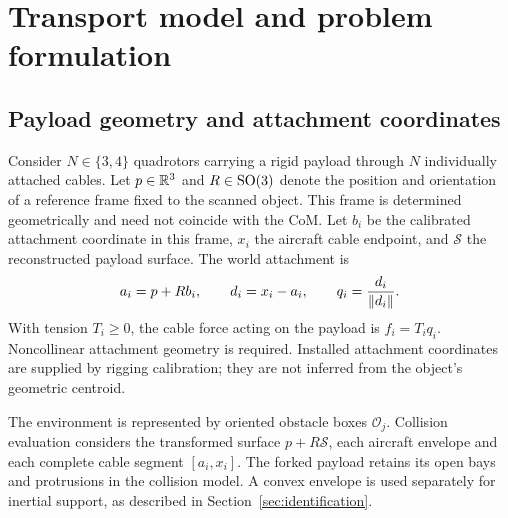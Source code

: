 \section{Transport model and problem formulation}
\subsection{Payload geometry and attachment coordinates}
Consider $N\in\{3,4\}$ quadrotors carrying a rigid payload through $N$ individually attached cables. Let $p\in\mathbb{R}^3$ and $R\in\mathrm{SO}(3)$ denote the position and orientation of a reference frame fixed to the scanned object. This frame is determined geometrically and need not coincide with the CoM. Let $b_i$ be the calibrated attachment coordinate in this frame, $x_i$ the aircraft cable endpoint, and $\mathcal{S}$ the reconstructed payload surface. The world attachment is
\begin{equation}
 a_i=p+Rb_i,\qquad d_i=x_i-a_i,\qquad q_i=\frac{d_i}{\left\lVert d_i\right\rVert}.
 \label{eq:attachments}
\end{equation}
With tension $T_i\geq0$, the cable force acting on the payload is $f_i=T_iq_i$. Noncollinear attachment geometry is required. Installed attachment coordinates are supplied by rigging calibration; they are not inferred from the object's geometric centroid.

The environment is represented by oriented obstacle boxes $\mathcal{O}_j$. Collision evaluation considers the transformed surface $p+R\mathcal{S}$, each aircraft envelope and each complete cable segment $[a_i,x_i]$. The forked payload retains its open bays and protrusions in the collision model. A convex envelope is used separately for inertial support, as described in Section~\ref{sec:identification}.

